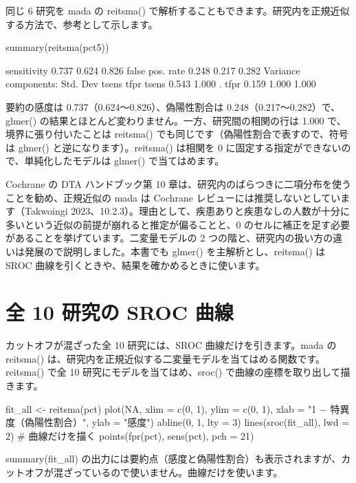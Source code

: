 同じ 6 研究を mada の reitsma() で解析することもできます。研究内を正規近似する方法で、参考として示します。

\begin{rcode}
summary(reitsma(pct5))
\end{rcode}

\begin{rout}
sensitivity          0.737  0.624  0.826
false pos. rate      0.248  0.217  0.282
Variance components:
      Std. Dev tsens  tfpr
tsens    0.543 1.000     .
tfpr     0.159 1.000 1.000
\end{rout}

要約の感度は 0.737（0.624〜0.826）、偽陽性割合は 0.248（0.217〜0.282）で、glmer() の結果とほとんど変わりません。一方、研究間の相関の行は 1.000 で、境界に張り付いたことは reitsma() でも同じです（偽陽性割合で表すので、符号は glmer() と逆になります）。reitsma() は相関を 0 に固定する指定ができないので、単純化したモデルは glmer() で当てはめます。

Cochrane の DTA ハンドブック第 10 章は、研究内のばらつきに二項分布を使うことを勧め、正規近似の mada は Cochrane レビューには推奨しないとしています（Takwoingi 2023、10.2.3）。理由として、疾患ありと疾患なしの人数が十分に多いという近似の前提が崩れると推定が偏ることと、0 のセルに補正を足す必要があることを挙げています。二変量モデルの 2 つの階と、研究内の扱い方の違いは発展ので説明しました。本書でも glmer() を主解析とし、reitsma() は SROC 曲線を引くときや、結果を確かめるときに使います。

\section{全 10 研究の SROC 曲線}
\label{sec:13-8}

カットオフが混ざった全 10 研究には、SROC 曲線だけを引きます。mada の reitsma() は、研究内を正規近似する二変量モデルを当てはめる関数です。reitsma() で全 10 研究にモデルを当てはめ、sroc() で曲線の座標を取り出して描きます。

\begin{rcode}
fit_all <- reitsma(pct)
plot(NA, xlim = c(0, 1), ylim = c(0, 1),
     xlab = "1 − 特異度（偽陽性割合）", ylab = "感度")
abline(0, 1, lty = 3)
lines(sroc(fit_all), lwd = 2)       # 曲線だけを描く
points(fpr(pct), sens(pct), pch = 21)
\end{rcode}

summary(fit\_all) の出力には要約点（感度と偽陽性割合）も表示されますが、カットオフが混ざっているので使いません。曲線だけを使います。

